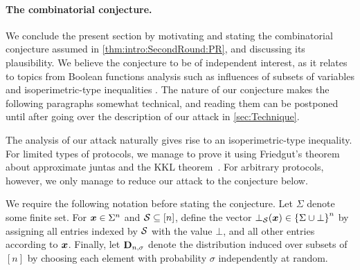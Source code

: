 \paragraph{The combinatorial conjecture.}
We conclude the present section by motivating and stating the combinatorial conjecture assumed in \cref{thm:intro:SecondRound:PR}, and discussing its plausibility. We believe the conjecture to be of independent interest, as it relates to topics from Boolean functions analysis such as influences of subsets of variables \cite{Odonnel14} and isoperimetric-type inequalities \cite{MosselORSS2006,MosselOS2013}. The nature of our conjecture makes the following paragraphs somewhat technical, and reading them can be postponed until after going over the description of our attack in \cref{sec:Technique}.

The analysis of our attack naturally gives rise to an isoperimetric-type inequality. For limited types of protocols, we manage to prove it using Friedgut's theorem~\cite{Friedgut98} about approximate juntas and the KKL theorem~\cite{KKL88}. For arbitrary protocols, however, we only manage to reduce our attack to the conjecture below.

We require the following notation before stating the conjecture. Let $\Sigma$ denote some finite set.
For ${ \boldsymbol{x}}\in \Sigma^n$ and $\mathcal{S} \subseteq [n]$, define the vector $\bot_{\mathcal{S}}({ \boldsymbol{x}}) \in \left\{\Sigma \cup \bot\right\}^n$ by assigning all entries indexed by $\mathcal{S}$ with the value $\bot$, and all other entries according to ${ \boldsymbol{x}}$. Finally, let $\mathbf{D}_{n,\sigma}$ denote the distribution induced over subsets of $[n]$ by choosing each element with probability $\sigma$ independently at random.

\def\MainConj{
For any $\sigma,\lambda >0$ there exists $\delta>0$ such that the following holds for large enough $n\in \N$: let $\Sigma$ be a finite alphabet, and let $\cA_0,\cA_1 \subseteq \sbn$ be two sets such that for both $b\in \zo$:

\begin{align*}%
\ppr{\cs\gets \bns}{\ppr{\vr \gets \Sigma^n}{\vr,\bot_{\cS}(\vr) \in \cA_b} \ge \lambda } \ge 1-\delta.
\end{align*}
Then,
\begin{align*}%
\ppr{\substack{\cS \gets \bns \vspace{.05in}\\ \vr\gets \Sigma^n }}{\forall b\in \zo\colon \set{\vr,\bot_{\cS}(\vr)} \cap \cA_b \neq \emptyset} \ge \delta.
\end{align*}
}

